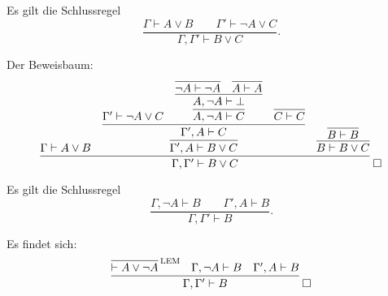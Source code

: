 \newpage
\begin{Satz}[Resolution]
Es gilt die Schlussregel
\[\dfrac{\Gamma\vdash A\lor B\qquad\Gamma'\vdash\neg A\lor C}{\Gamma,\Gamma'\vdash B\lor C}.\]
\end{Satz}
\begin{Beweis}
Der Beweisbaum:
\[
\infer{\Gamma,\Gamma'\vdash B\lor C}{
  \Gamma\vdash A\lor B
& \infer{\Gamma', A\vdash B\lor C}{
    \infer{\Gamma', A\vdash C}{
      \Gamma'\vdash\neg A\lor C
    & \infer{A,\neg A\vdash C}{
        \infer{A,\neg A\vdash\bot}{
          \infer{\neg A\vdash \neg A}{}
        & \infer{A\vdash A}{}}}
    & \infer{C\vdash C}{}}}
& \infer{B\vdash B\lor C}{\infer{B\vdash B}{}}}\;\qedsymbol
\]
\end{Beweis}

\begin{Satz} \strong{[LEM]}
Es gilt die Schlussregel
\[\dfrac{\Gamma,\neg A\vdash B\qquad\Gamma', A\vdash B}{\Gamma,\Gamma'\vdash B}.\]
\end{Satz}
\begin{Beweis}
Es findet sich:
\[\infer{\Gamma,\Gamma'\vdash B}{
  \infer[\infernote{LEM}]{\vdash A\lor\neg A}{}
& \Gamma,\neg A\vdash B
& \Gamma', A\vdash B
}\;\qedsymbol\]
\end{Beweis}

